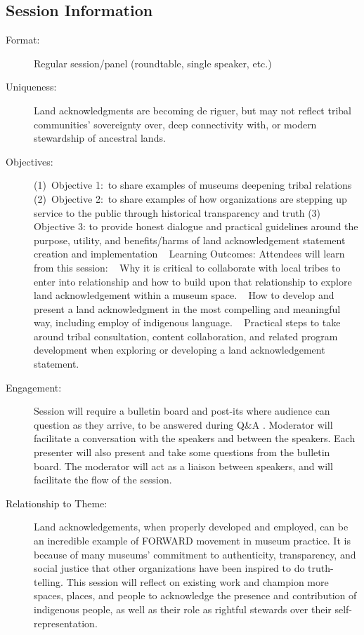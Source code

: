 \documentclass{report}
\begin{document}
              \subsection*{Session Information}
                \begin{description}
                  \item [Format:] Regular session/panel (roundtable, single speaker, etc.)
							    
							    \item [Uniqueness:]Land acknowledgments are becoming de riguer, but may not reflect tribal communities’ sovereignty over, deep connectivity with, or modern stewardship of ancestral lands.
							    \item [Objectives:](1) Objective 1: to share examples of museums deepening tribal relations 
(2) Objective 2: to share examples of how organizations are stepping up service to the public through historical transparency and truth
(3) Objective 3: to provide honest dialogue and practical guidelines around the purpose, utility, and benefits/harms of land acknowledgement statement creation and implementation
 
Learning Outcomes: Attendees will learn from this session: 
 
Why it is critical to collaborate with local tribes to enter into relationship and how to build upon that relationship to explore land acknowledgement within a museum space.
 
How to develop and present a land acknowledgment in the most compelling and meaningful way, including employ of indigenous language.
 
Practical steps to take around tribal consultation, content collaboration, and related program development when exploring or developing a land acknowledgement statement.
							    \item [Engagement:]Session will require a bulletin board and post-its where audience can question as they arrive, to be answered during Q\&A .
Moderator will facilitate a conversation with the speakers and between the speakers. Each presenter will also present and  take some questions from the bulletin board. The moderator will act as a liaison between speakers, and will facilitate the flow of the session.
							    \item [Relationship to Theme:]Land acknowledgements, when properly developed and employed, can be an incredible example of FORWARD movement in museum practice. It is because of many museums’ commitment to authenticity, transparency, and social justice that other organizations have been inspired to do truth-telling. This session will reflect on existing work and champion more spaces, places, and people to acknowledge the presence and contribution of indigenous people, as well as their role as rightful stewards over their self-representation.
							    

\end{description}
\end{document}
